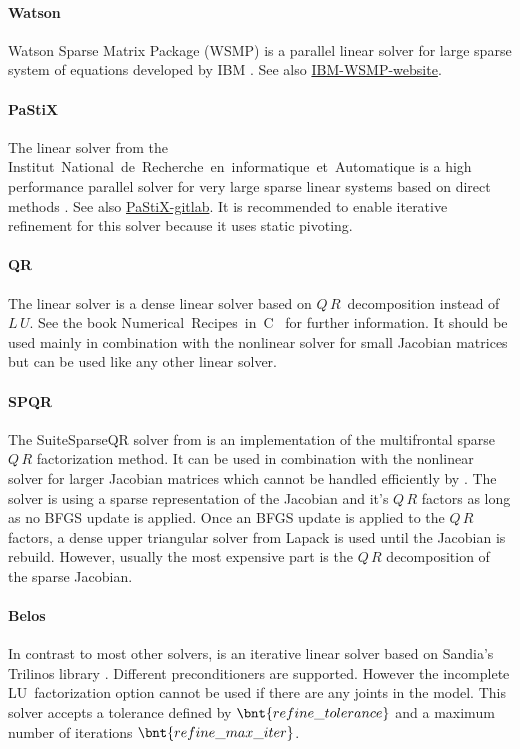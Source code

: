 \paragraph{Watson}
Watson Sparse Matrix Package (WSMP) is a parallel linear solver for large sparse system of equations developed by IBM \cite{10.1145/569147.569149}.
See also \href{https://researcher.watson.ibm.com/researcher/view_group.php?id=1426}{IBM-WSMP-website}.

\paragraph{PaStiX}
The  linear solver from the Institut~National~de~Recherche~en~informatique~et~Automatique
is a high performance parallel solver for very large sparse linear systems based on direct methods \cite{henon:inria-00346017}.
See also \href{https://gitlab.inria.fr/solverstack/pastix}{PaStiX-gitlab}.
It is recommended to enable iterative refinement for this solver because it uses static pivoting.

\paragraph{QR}
The  linear solver is a dense linear solver based on $Q\,R$~decomposition instead of $L\,U$.
See the book Numerical~Recipes~in~{C}~\cite{NUMERICAL-RECIPES-IN-C} for further information.
It should be used mainly in combination with the  nonlinear solver for small Jacobian
matrices but can be used like any other linear solver.

\paragraph{SPQR}
The SuiteSparseQR solver  from \cite{SUITESPARSE-QR-2011} is an implementation
of the multifrontal sparse $Q\,R$ factorization method. It can be used in combination
with the  nonlinear solver for larger Jacobian matrices which cannot be
handled efficiently by . The  solver is using a sparse representation
of the Jacobian and it's $Q\,R$ factors as long as no BFGS update is applied.
Once an BFGS update is applied to the $Q\,R$ factors, a dense upper triangular solver
from Lapack is used until the Jacobian is rebuild. However, usually the most expensive
part is the $Q\,R$ decomposition of the sparse Jacobian.

\paragraph{Belos}
In contrast to most other solvers,  is an iterative linear solver based on
Sandia's Trilinos library \cite{TRILINOS-WEBSITE}. Different preconditioners are supported.
However the incomplete LU~factorization option  cannot be used if there are any
joints in the model. This solver accepts a tolerance defined by $\bnt{refine\_tolerance}$ and
a maximum number of iterations $\bnt{refine\_max\_iter}$.

